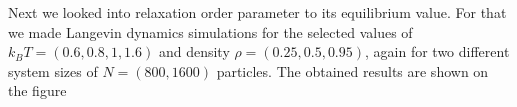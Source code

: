 Next we looked into relaxation order parameter to its equilibrium value. For that we made Langevin dynamics simulations for the selected values of $k_BT = (0.6, 0.8, 1, 1.6)$ and density $\rho = (0.25, 0.5, 0.95)$, again for two different system sizes of $N = (800, 1600)$ particles. The obtained results are shown on the figure

